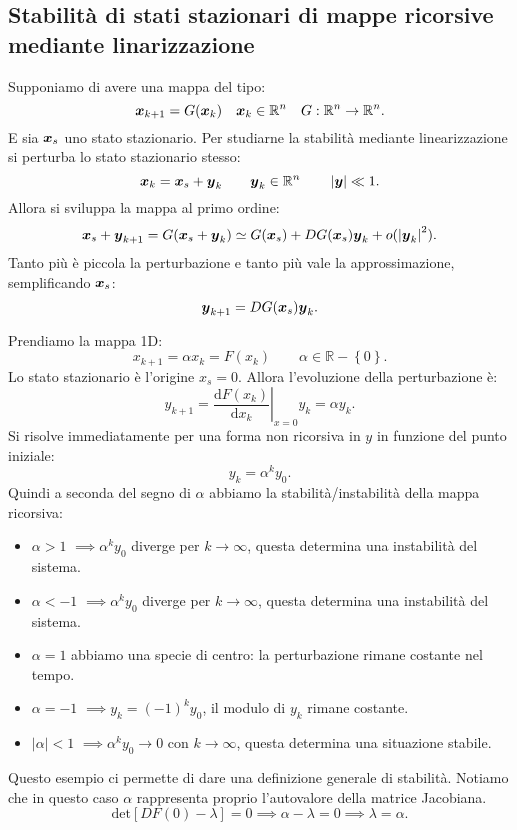 \subsection{Stabilità di stati stazionari di mappe ricorsive mediante linarizzazione}%
Supponiamo di avere una mappa del tipo:
\[
    \boldsymbol{x}_{k+1} = G(\boldsymbol{x}_k) \quad  \boldsymbol{x}_k \in \mathbb{R}^n \quad  G: \mathbb{R}^n\to \mathbb{R}^n
.\] 
E sia $\boldsymbol{x}_s$ uno stato stazionario. Per studiarne la stabilità mediante linearizzazione si perturba lo stato stazionario stesso:
\[
    \boldsymbol{x}_k = \boldsymbol{x}_s + \boldsymbol{y}_k \qquad  \boldsymbol{y}_k \in \mathbb{R}^n \qquad  \left|\boldsymbol{y}\right|\ll 1
.\] 
Allora si sviluppa la mappa al primo ordine:
\[
    \boldsymbol{x}_s + \boldsymbol{y}_{k+1} = G(\boldsymbol{x}_s + \boldsymbol{y}_k) \simeq G(\boldsymbol{x}_s) + DG(\boldsymbol{x}_s) \boldsymbol{y}_k + o(\left|\boldsymbol{y}_k\right|^2) 
.\] 
Tanto più è piccola la perturbazione e tanto più vale la approssimazione, semplificando $\boldsymbol{x}_s$:
\[
    \boldsymbol{y}_{k+1}=DG(\boldsymbol{x}_s) \boldsymbol{y}_{k}
.\] 
\begin{exmp}[]
    Prendiamo la mappa 1D:
    \[
	x_{k+1}=  \alpha x_k = F(x_k)  \qquad \alpha \in \mathbb{R} - \left\{0\right\}
    .\] 
    Lo stato stazionario è l'origine $x_s = 0$. Allora l'evoluzione della perturbazione è:
    \[
	y_{k+1} = \left.\frac{\text{d} F(x_k) }{\text{d} x_k}\right|_{x = 0} y_k = \alpha y_k
    .\] 
    Si risolve immediatamente per una forma non ricorsiva in $y$ in funzione del punto iniziale:
    \[
        y_k = \alpha^k y_0
    .\] 
    Quindi a seconda del segno di $\alpha$ abbiamo la stabilità/instabilità della mappa ricorsiva:
    \begin{itemize}
	\item $\alpha >1$ $\implies  \alpha^ky_0 $ diverge per $k\to \infty$, questa determina una instabilità del sistema.
	\item $\alpha < -1$ $\implies \alpha^ky_0 $ diverge per $k\to \infty$, questa determina una instabilità del sistema. 
	\item $\alpha = 1$ abbiamo una specie di centro: la perturbazione rimane costante nel tempo.
	\item $\alpha  = -1$ $\implies  y_k = (-1)^ky_0$, il modulo di $y_k$ rimane costante. 
	\item $\left|\alpha\right|<1$ $\implies  \alpha^ky_0 \to 0$ con $k\to \infty$, questa determina una situazione stabile.
    \end{itemize}
    Questo esempio ci permette di dare una definizione generale di stabilità. Notiamo che in questo caso $\alpha$ rappresenta proprio l'autovalore della matrice Jacobiana.
    \[
	\text{det}\left[DF(0) - \lambda\right] = 0 \implies  \alpha-\lambda = 0 \implies  \lambda  = \alpha
    .\] 
\end{exmp}
